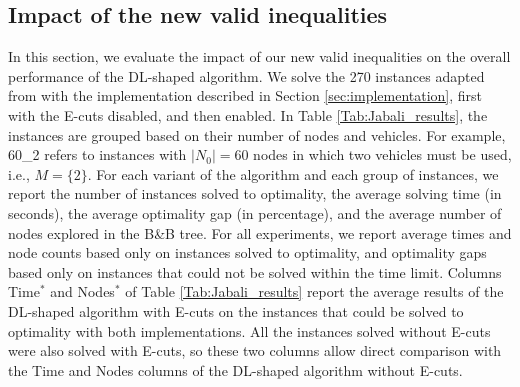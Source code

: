 \documentclass{article}
\newcommand{\rev}[1]{{\color{black}#1}}
\begin{document}
\subsection{Impact of the new valid inequalities} \label{sec:experiments:e-cuts}
In this section, we evaluate the impact of our new valid inequalities on the overall performance of the DL-shaped algorithm. We solve the 270 instances adapted from \cite{jabali2014partial} with the implementation described in Section \ref{sec:implementation}, first with the E-cuts disabled, and then enabled. In Table \ref{Tab:Jabali_results}, the instances are grouped based on their number of nodes and vehicles. For example, 60\_2 refers to instances with $|N_0|=60$ nodes in which two vehicles must be used, i.e., $M=\{2\}$. For each variant of the algorithm and each group of instances, we report the number of instances solved to optimality, the average solving time (in seconds), the average optimality gap (in percentage), and the average number of nodes explored in the B\&B tree. For all experiments, we report average times and node counts based only on instances solved to optimality, and optimality gaps based only on instances that could not be solved within the time limit. Columns Time$^*$ and Nodes$^*$ of Table \ref{Tab:Jabali_results} report the average results of the DL-shaped algorithm with E-cuts on the instances that could be solved to optimality with both implementations. \rev{All the instances solved without E-cuts were also solved with E-cuts, so these two columns allow direct comparison with the Time and Nodes columns of the DL-shaped algorithm without E-cuts.}
\end{document}
